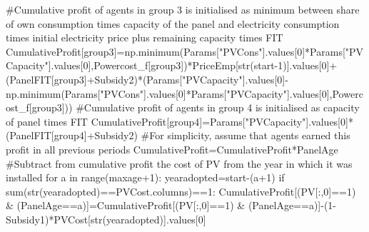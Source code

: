 \documentclass[
  letterpaper,
  DIV=11,
  numbers=noendperiod]{scrartcl}
\newenvironment{Shaded}{\begin{snugshade}}{\end{snugshade}}
\newcommand{\BuiltInTok}[1]{\textcolor[rgb]{0.00,0.23,0.31}{#1}}
\newcommand{\CommentTok}[1]{\textcolor[rgb]{0.37,0.37,0.37}{#1}}
\newcommand{\ControlFlowTok}[1]{\textcolor[rgb]{0.00,0.23,0.31}{#1}}
\newcommand{\DecValTok}[1]{\textcolor[rgb]{0.68,0.00,0.00}{#1}}
\newcommand{\KeywordTok}[1]{\textcolor[rgb]{0.00,0.23,0.31}{#1}}
\newcommand{\NormalTok}[1]{\textcolor[rgb]{0.00,0.23,0.31}{#1}}
\newcommand{\OperatorTok}[1]{\textcolor[rgb]{0.37,0.37,0.37}{#1}}
\newcommand{\StringTok}[1]{\textcolor[rgb]{0.13,0.47,0.30}{#1}}
\begin{document}
\begin{Shaded}
\begin{Highlighting}[]
    \CommentTok{\#Cumulative profit of agents in group 3 is initialised as minimum between share of own consumption times capacity of the panel and electricity consumption times initial electricity price plus remaining capacity times FIT}
\NormalTok{    CumulativeProfit[group3]}\OperatorTok{=}\NormalTok{np.minimum(Params[}\StringTok{"PVCons"}\NormalTok{].values[}\DecValTok{0}\NormalTok{]}\OperatorTok{*}\NormalTok{Params[}\StringTok{"PVCapacity"}\NormalTok{].values[}\DecValTok{0}\NormalTok{],Powercost\_f[group3])}\OperatorTok{*}\NormalTok{PriceEmp[}\BuiltInTok{str}\NormalTok{(start}\OperatorTok{{-}}\DecValTok{1}\NormalTok{)].values[}\DecValTok{0}\NormalTok{]}\OperatorTok{+}\NormalTok{(PanelFIT[group3]}\OperatorTok{+}\NormalTok{Subsidy2)}\OperatorTok{*}\NormalTok{(Params[}\StringTok{"PVCapacity"}\NormalTok{].values[}\DecValTok{0}\NormalTok{]}\OperatorTok{{-}}\NormalTok{np.minimum(Params[}\StringTok{"PVCons"}\NormalTok{].values[}\DecValTok{0}\NormalTok{]}\OperatorTok{*}\NormalTok{Params[}\StringTok{"PVCapacity"}\NormalTok{].values[}\DecValTok{0}\NormalTok{],Powercost\_f[group3]))}
    \CommentTok{\#Cumulative profit of agents in group 4 is initialised as capacity of panel times FIT}
\NormalTok{    CumulativeProfit[group4]}\OperatorTok{=}\NormalTok{Params[}\StringTok{"PVCapacity"}\NormalTok{].values[}\DecValTok{0}\NormalTok{]}\OperatorTok{*}\NormalTok{(PanelFIT[group4]}\OperatorTok{+}\NormalTok{Subsidy2)}
    \CommentTok{\#For simplicity, assume that agents earned this profit in all previous periods}
\NormalTok{    CumulativeProfit}\OperatorTok{=}\NormalTok{CumulativeProfit}\OperatorTok{*}\NormalTok{PanelAge}
    \CommentTok{\#Subtract from cumulative profit the cost of PV from the year in which it was installed}
    \ControlFlowTok{for}\NormalTok{ a }\KeywordTok{in} \BuiltInTok{range}\NormalTok{(maxage}\OperatorTok{+}\DecValTok{1}\NormalTok{):}
\NormalTok{        yearadopted}\OperatorTok{=}\NormalTok{start}\OperatorTok{{-}}\NormalTok{(a}\OperatorTok{+}\DecValTok{1}\NormalTok{)}
        \ControlFlowTok{if} \BuiltInTok{sum}\NormalTok{(}\BuiltInTok{str}\NormalTok{(yearadopted)}\OperatorTok{==}\NormalTok{PVCost.columns)}\OperatorTok{==}\DecValTok{1}\NormalTok{:}
\NormalTok{            CumulativeProfit[(PV[:,}\DecValTok{0}\NormalTok{]}\OperatorTok{==}\DecValTok{1}\NormalTok{) }\OperatorTok{\&}\NormalTok{ (PanelAge}\OperatorTok{==}\NormalTok{a)]}\OperatorTok{=}\NormalTok{CumulativeProfit[(PV[:,}\DecValTok{0}\NormalTok{]}\OperatorTok{==}\DecValTok{1}\NormalTok{) }\OperatorTok{\&}\NormalTok{ (PanelAge}\OperatorTok{==}\NormalTok{a)]}\OperatorTok{{-}}\NormalTok{(}\DecValTok{1}\OperatorTok{{-}}\NormalTok{Subsidy1)}\OperatorTok{*}\NormalTok{PVCost[}\BuiltInTok{str}\NormalTok{(yearadopted)].values[}\DecValTok{0}\NormalTok{]}

\end{Highlighting}
\end{Shaded}
\end{document}
